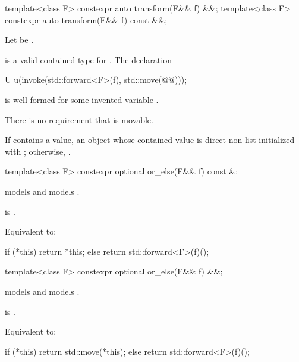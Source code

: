 \begin{itemdecl}
template<class F> constexpr auto transform(F&& f) &&;
template<class F> constexpr auto transform(F&& f) const &&;
\end{itemdecl}

\begin{itemdescr}
\pnum
Let  be
.

\pnum
\mandates
{} is a valid contained type for .
The declaration
\begin{codeblock}
U u(invoke(std::forward<F>(f), std::move(@@)));
\end{codeblock}
is well-formed for some invented variable .
\begin{note}
There is no requirement that  is movable.
\end{note}

\pnum
\returns
If  contains a value, an  object
whose contained value is direct-non-list-initialized with
;
otherwise, .
\end{itemdescr}

\begin{itemdecl}
template<class F> constexpr optional or_else(F&& f) const &;
\end{itemdecl}

\begin{itemdescr}
\pnum
\constraints
{} models  and
 models .

\pnum
\mandates
{} is .

\pnum
\effects
Equivalent to:
\begin{codeblock}
if (*this) {
  return *this;
} else {
  return std::forward<F>(f)();
}
\end{codeblock}
\end{itemdescr}

\begin{itemdecl}
template<class F> constexpr optional or_else(F&& f) &&;
\end{itemdecl}

\begin{itemdescr}
\pnum
\constraints
{} models  and
 models .

\pnum
\mandates
{} is .

\pnum
\effects
Equivalent to:
\begin{codeblock}
if (*this) {
  return std::move(*this);
} else {
  return std::forward<F>(f)();
}
\end{codeblock}
\end{itemdescr}

